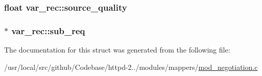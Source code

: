 \subsubsection[{\texorpdfstring{source\+\_\+quality}{source_quality}}]{\setlength{\rightskip}{0pt plus 5cm}float var\+\_\+rec\+::source\+\_\+quality}\hypertarget{structvar__rec_a8199c3a45754e9ae50d7f7e5f106b072}{}\label{structvar__rec_a8199c3a45754e9ae50d7f7e5f106b072}
\subsubsection[{\texorpdfstring{sub\+\_\+req}{sub_req}}]{$\ast$ var\+\_\+rec\+::sub\+\_\+req}\hypertarget{structvar__rec_ac3207312c3e51dce5b1ce1f4623e51cd}{}\label{structvar__rec_ac3207312c3e51dce5b1ce1f4623e51cd}


The documentation for this struct was generated from the following file\+:\begin{DoxyCompactItemize}
\item 
/usr/local/src/github/\+Codebase/httpd-\/2../modules/mappers/\hyperlink{mod__negotiation_8c}{mod\+\_\+negotiation.\+c}\end{DoxyCompactItemize}
